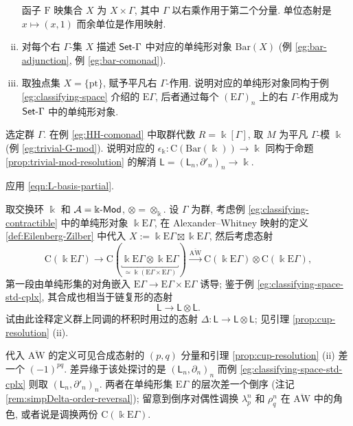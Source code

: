 \begin{Exercises}
\begin{enumerate}[(i)]
		\begin{hint}
			函子 $\mathrm{F}$ 映集合 $X$ 为 $X \times \Gamma$, 其中 $\Gamma$ 以右乘作用于第二个分量. 单位态射是 $x \mapsto (x, 1)$ 而余单位是作用映射.
		\end{hint}
		\item 对每个右 $\Gamma$-集 $X$ 描述 $\mathsf{Set}\text{-}\Gamma$ 中对应的单纯形对象 $\mathrm{Bar}(X)$ (例 \ref{eg:bar-adjunction}, 例 \ref{eg:bar-comonad}).
		\item 取独点集 $X = \{\mathrm{pt}\}$, 赋予平凡右 $\Gamma$-作用. 说明对应的单纯形对象同构于例 \ref{eg:classifying-space} 介绍的 $\mathrm{E}\Gamma$, 后者通过每个 $(\mathrm{E}\Gamma)_n$ 上的右 $\Gamma$-作用成为 $\mathsf{Set}\text{-}\Gamma$ 中的单纯形对象.
	\end{enumerate}

	\item 选定群 $\Gamma$. 在例 \ref{eg:HH-comonad} 中取群代数 $R = \Bbbk[\Gamma]$, 取 $M$ 为平凡 $\Gamma$-模 $\Bbbk$ (例 \ref{eg:trivial-G-mod}). 说明对应的 $\epsilon_{\Bbbk}: \mathrm{C}(\mathrm{Bar}(\Bbbk)) \to \Bbbk$ 同构于命题 \ref{prop:trivial-mod-resolution} 的解消 $\mathsf{L} = (\mathsf{L}_n, \partial'_n)_n \to \Bbbk$.
	\begin{hint}
		应用 \eqref{eqn:L-basis-partial}.
	\end{hint}

	\item 取交换环 $\Bbbk$ 和 $\mathcal{A} = \Bbbk\text{-}\mathsf{Mod}$, $\otimes = \otimes_{\Bbbk}$. 设 $\Gamma$ 为群, 考虑例 \ref{eg:classifying-contractible} 中的单纯形对象 $\Bbbk\mathrm{E}\Gamma$, 在 Alexander--Whitney 映射的定义 \ref{def:Eilenberg-Zilber} 中代入 $X := \Bbbk\mathrm{E}\Gamma \boxtimes \Bbbk\mathrm{E}\Gamma$, 然后考虑态射
	\[ \mathrm{C}(\Bbbk\mathrm{E}\Gamma) \to \mathrm{C}(\underbracket{\Bbbk\mathrm{E}\Gamma \otimes \Bbbk\mathrm{E}\Gamma}_{\simeq \Bbbk(\mathrm{E}\Gamma \times \mathrm{E}\Gamma)}) \xrightarrow{\overline{\mathrm{AW}}} \mathrm{C}(\Bbbk\mathrm{E}\Gamma) \otimes \mathrm{C}(\Bbbk\mathrm{E}\Gamma), \]
	第一段由单纯形集的对角嵌入 $\mathrm{E}\Gamma \to \mathrm{E}\Gamma \times \mathrm{E}\Gamma$ 诱导; 鉴于例 \ref{eg:classifying-space-std-cplx}, 其合成也相当于链复形的态射
	\[ \mathsf{L} \to \mathsf{L} \otimes \mathsf{L}. \]
	试由此诠释定义群上同调的杯积时用过的态射 $\Delta: \mathsf{L} \to \mathsf{L} \otimes \mathsf{L}$; 见引理 \ref {prop:cup-resolution} (ii).
	
	\begin{hint}
		代入 $\overline{\mathrm{AW}}$ 的定义可见合成态射的 $(p, q)$ 分量和引理 \ref {prop:cup-resolution} (ii) 差一个 $(-1)^{pq}$. 差异缘于该处探讨的是 $(\mathsf{L}_n, \partial_n)_n$ 而例 \ref{eg:classifying-space-std-cplx} 则取 $(\mathsf{L}_n, \partial'_n)_n$. 两者在单纯形集 $\mathrm{E}\Gamma$ 的层次差一个倒序 (注记 \ref{rem:simpDelta-order-reversal}); 留意到倒序对偶性调换 $\lambda^n_p$ 和 $\rho^n_q$ 在 $\overline{\mathrm{AW}}$ 中的角色, 或者说是调换两份 $\mathrm{C}(\Bbbk\mathrm{E}\Gamma)$.
	\end{hint}


\end{Exercises}
